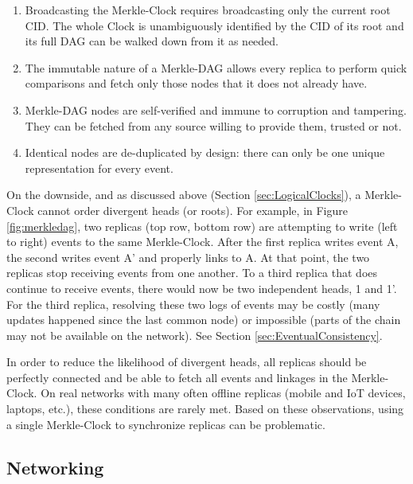 \documentclass{textile}
\begin{document}
\begin{enumerate}
\item Broadcasting the Merkle-Clock requires broadcasting only the current root CID. The whole Clock is unambiguously identified by the CID of its root and its full DAG can be walked down from it as needed.
\item The immutable nature of a Merkle-DAG allows every replica to perform quick comparisons and fetch only those nodes that it does not already have.
\item Merkle-DAG nodes are self-verified and immune to corruption and tampering. They can be fetched from any source willing to provide them, trusted or not.
\item Identical nodes are de-duplicated by design: there can only be one unique representation for every event.
\end{enumerate}

On the downside, and as discussed above (Section \ref{sec:LogicalClocks}), a Merkle-Clock cannot order divergent heads (or roots). For example, in Figure \ref{fig:merkledag}, two replicas (top row, bottom row) are attempting to write (left to right) events to the same Merkle-Clock. After the first replica writes event A, the second writes event A' and properly links to A. At that point, the two replicas stop receiving events from one another. To a third replica that does continue to receive events, there would now be two independent heads, 1 and 1'. For the third replica, resolving these two logs of events may be costly (many updates happened since the last common node) or impossible (parts of the chain may not be available on the network). See Section  \ref{sec:EventualConsistency}.

In order to reduce the likelihood of divergent heads, all replicas should be perfectly connected and be able to fetch all events and linkages in the Merkle-Clock. On real networks with many often offline replicas (mobile and IoT devices, laptops, etc.), these conditions are rarely met. Based on these observations, using a single Merkle-Clock to synchronize replicas can be problematic.

\FloatBarrier

\subsection{Networking}
\end{document}
